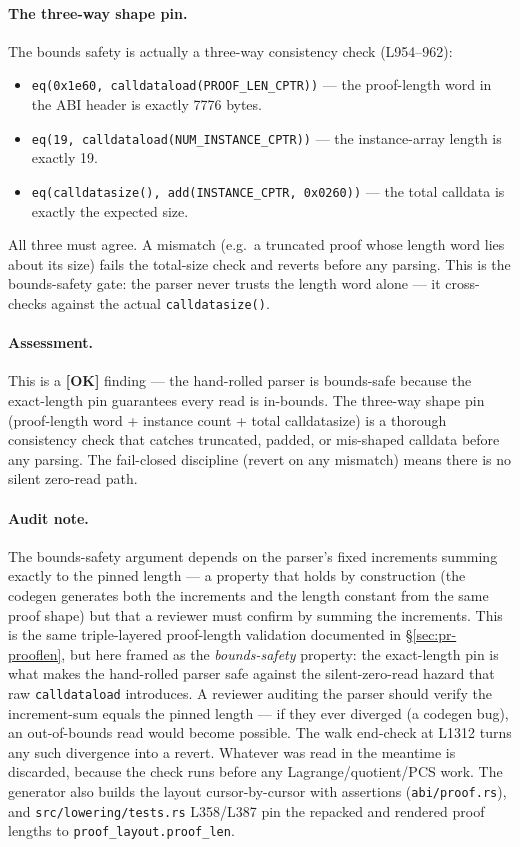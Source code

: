 \paragraph{The three-way shape pin.} The bounds safety is actually
a three-way consistency check (L954--962):
\begin{itemize}
\item \texttt{eq(0x1e60, calldataload(PROOF\_\allowbreak{}LEN\_\allowbreak{}CPTR))} ---
  the proof-length word in the ABI header is exactly 7776 bytes.
\item \texttt{eq(19, calldataload(NUM\_\allowbreak{}INSTANCE\_\allowbreak{}CPTR))} --- the
  instance-array length is exactly 19.
\item \texttt{eq(calldatasize(), add(INSTANCE\_\allowbreak{}CPTR, 0x0260))}
  --- the total calldata is exactly the expected size.
\end{itemize}
All three must agree. A mismatch (e.g.\ a truncated proof whose
length word lies about its size) fails the total-size check and
reverts before any parsing. This is the bounds-safety gate: the
parser never trusts the length word alone --- it cross-checks
against the actual \texttt{calldatasize()}.

\paragraph{Assessment.} This is a
\textcolor{tracegreen}{\textbf{[OK]}} finding --- the hand-rolled
parser is bounds-safe because the exact-length pin guarantees every
read is in-bounds. The three-way shape pin (proof-length word +
instance count + total calldatasize) is a thorough consistency
check that catches truncated, padded, or mis-shaped calldata before
any parsing. The fail-closed discipline (revert on any mismatch)
means there is no silent zero-read path.

\paragraph{Audit note.} The bounds-safety argument depends on the
parser's fixed increments summing exactly to the pinned length
--- a property that holds by construction (the codegen generates
both the increments and the length constant from the same proof
shape) but that a reviewer must confirm by summing the increments.
This is the same triple-layered proof-length validation documented
in \S\ref{sec:pr-prooflen}, but here framed as the
\emph{bounds-safety} property: the exact-length pin is what makes
the hand-rolled parser safe against the silent-zero-read hazard
that raw \texttt{calldataload} introduces. A reviewer auditing the
parser should verify the increment-sum equals the pinned length ---
if they ever diverged (a codegen bug), an out-of-bounds read would
become possible.  The walk end-check at L1312
turns any such divergence into a revert. Whatever was read in the
meantime is discarded, because the check runs before any
Lagrange/quotient/PCS work. The generator also builds the layout
cursor-by-cursor with assertions (\texttt{abi/proof.rs}), and
\texttt{src/\allowbreak{}lowering/\allowbreak{}tests.rs} L358/L387 pin the repacked and
rendered proof lengths to \texttt{proof\_\allowbreak{}layout.proof\_\allowbreak{}len}.

